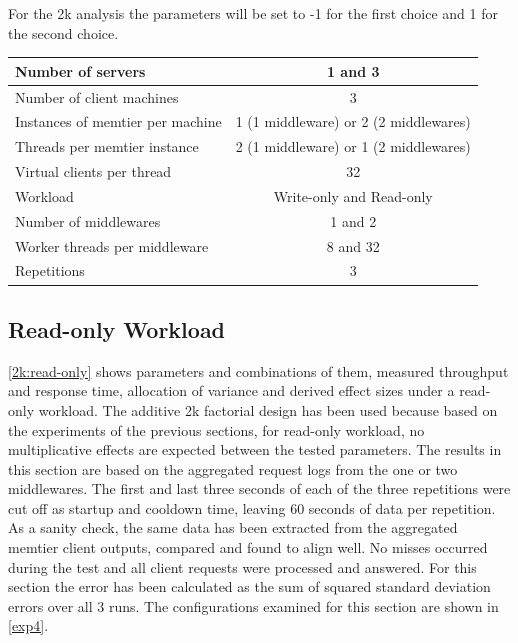 \documentclass[11pt,a4paper]{article}
\begin{document}
For the 2k analysis the parameters will be set to -1 for the first choice and 1 for the second choice.


\begin{center}
	\scriptsize{
		\begin{tabular}{|l|c|}
			\hline Number of servers                & 1 and 3                                     \\ 
			\hline Number of client machines        & 3                                           \\ 
			\hline Instances of memtier per machine & 1 (1 middleware) or 2 (2 middlewares)       \\ 
			\hline Threads per memtier instance     & 2 (1 middleware) or 1 (2 middlewares)       \\
			\hline Virtual clients per thread       & 32                                          \\ 
			\hline Workload                         & Write-only and Read-only                    \\
			\hline Number of middlewares            & 1 and 2                                     \\
			\hline Worker threads per middleware    & 8 and 32                                    \\
			\hline Repetitions                      & 3                                   \\ 
			\hline 
		\end{tabular}
	} 
\end{center}

\subsection{Read-only Workload}\label{sec6.1}

\autoref{2k:read-only} shows parameters and combinations of them, measured throughput and response time, allocation of variance and derived effect sizes under a read-only workload. The additive 2k factorial design has been used because based on the experiments of the previous sections, for read-only workload, no multiplicative effects are expected between the tested parameters.
The results in this section are based on the aggregated request logs from the one or two middlewares. The first and last three seconds of each of the three repetitions were cut off as startup and cooldown time, leaving 60 seconds of data per repetition. As a sanity check, the same data has been extracted from the aggregated memtier client outputs, compared and found to align well. No misses occurred during the test and all client requests were processed and answered. For this section the error has been calculated as the sum of squared standard deviation errors over all 3 runs. The configurations examined for this section are shown in \autoref{exp4}.
\end{document}
